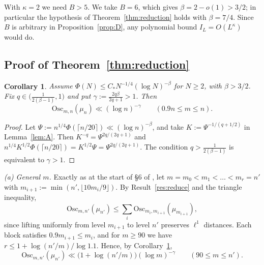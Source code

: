 \documentclass[11pt]{amsart}
\newtheorem{corollary}[theorem]{Corollary}
\theoremstyle{remark}
\newcommand{\Osc}{\mathrm{Osc}}
\newcommand{\Tc}{\cite{Tao22}}         %
\theoremstyle{plain}
\begin{document}
With $\kappa=2$ we need $B>5$. We take $B=6$, which gives $\beta=2-o(1)>3/2$; in particular the hypothesis of Theorem~\ref{thm:reduction} holds with $\beta=7/4$. Since $B$ is arbitrary in Proposition~\ref{prop:D}, any polynomial bound $I_L=O(L^\kappa)$ would do.

\subsection{Proof of Theorem~\ref{thm:reduction}}

\begin{corollary}\label{cor:Aprime}
Assume $\Phi(N)\le C_*N^{-1/4}(\log N)^{-\beta}$ for $N\ge2$, with $\beta>3/2$. Fix $q\in\big(\tfrac1{2(\beta-1)},1\big)$ and put $\gamma:=\tfrac{2q\beta}{2q+1}>1$. Then
\[
\Osc_{m,n}(\mu_n)\ll(\log n)^{-\gamma}\qquad(0.9n\le m\le n).
\]
\end{corollary}

\begin{proof}
Let $\Psi:=n^{1/4}\Phi(\lceil n/20\rceil)\ll(\log n)^{-\beta}$, and take $K:=\Psi^{-1/(q+1/2)}$ in Lemma~\ref{lem:A}. Then $K^{-q}=\Psi^{2q/(2q+1)}$ and $n^{1/4}K^{1/2}\Phi(\lceil n/20\rceil)=K^{1/2}\Psi=\Psi^{2q/(2q+1)}$. The condition $q>\frac1{2(\beta-1)}$ is equivalent to $\gamma>1$.
\end{proof}

\emph{(a) General $m$.} Exactly as at the start of \S6 of \Tc, let $m=m_0<m_1<\dots<m_r=n'$ with $m_{i+1}:=\min(n',\lfloor10m_i/9\rfloor)$. By Result~\ref{res:reduce} and the triangle inequality,
\[
\Osc_{m,n'}(\mu_{n'})\le\sum_i\Osc_{m_i,m_{i+1}}(\mu_{m_{i+1}}),
\]
since lifting uniformly from level $m_{i+1}$ to level $n'$ preserves $\ell^1$ distances. Each block satisfies $0.9m_{i+1}\le m_i$, and for $m\ge90$ we have $r\le1+\log(n'/m)/\log1.1$. Hence, by Corollary~\ref{cor:Aprime},
\begin{equation}\label{eq:osc-general}
\Osc_{m,n'}(\mu_{n'})\ll\big(1+\log(n'/m)\big)(\log m)^{-\gamma}\qquad(90\le m\le n').
\end{equation}
\end{document}
